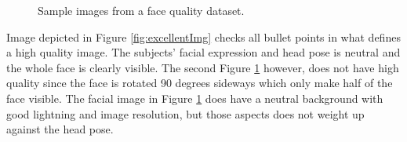 \begin{figure}[h]
{        \label{fig:defectedImg}}
    \caption{Sample images from a face quality dataset.}
\end{figure}
%
Image depicted in Figure \ref{fig:excellentImg} checks all bullet points in what defines a high quality image. The subjects' facial expression and head pose is neutral and the whole face is clearly visible. The second Figure \ref{fig:defectedImg} however, does not have high quality since the face is rotated 90 degrees sideways which only make half of the face visible. The facial image  in Figure \ref{fig:defectedImg} does have a neutral background with good lightning and image resolution, but those aspects does not weight up against the head pose.
\newpage
\begin{figure}[h]
\centering
     \\
        

\end{figure}
